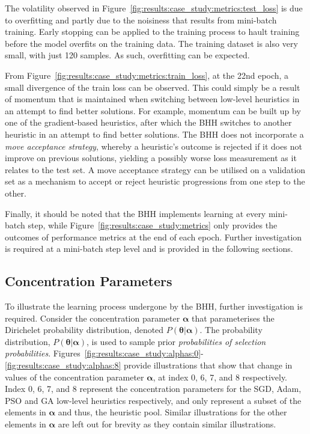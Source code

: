 The volatility observed in Figure~\ref{fig:results:case_study:metrics:test_loss} is due to overfitting and partly due to the noisiness that results from mini-batch training. Early stopping can be applied to the training process to hault training before the model overfits on the training data. The training dataset is also very small, with just 120 samples. As such, overfitting can be expected.

From Figure~\ref{fig:results:case_study:metrics:train_loss}, at the 22nd epoch, a small divergence of the train loss can be observed. This could simply be a result of momentum that is maintained when switching between low-level heuristics in an attempt to find better solutions. For example, momentum can be built up by one of the gradient-based heuristics, after which the \acs{BHH} switches to another heuristic in an attempt to find better solutions. The \acs{BHH} does not incorporate a \textit{move acceptance strategy}, whereby a heuristic's outcome is rejected if it does not improve on previous solutions, yielding a possibly worse loss measurement as it relates to the test set. A move acceptance strategy can be utilised on a validation set as a mechanism to accept or reject heuristic progressions from one step to the other.

Finally, it should be noted that the \acs{BHH} implements learning at every mini-batch step, while Figure~\ref{fig:results:case_study:metrics} only provides the outcomes of performance metrics at the end of each epoch. Further investigation is required at a mini-batch step level and is provided in the following sections.



\subsection{Concentration Parameters}\label{sec:results:case_study:concentration_parameters}

To illustrate the learning process undergone by the \acs{BHH}, further investigation is required. Consider the concentration parameter $\boldsymbol{\alpha}$ that parameterises the Dirichelet probability distribution, denoted $P(\boldsymbol{\theta} \vert \boldsymbol{\alpha})$. The probability distribution, $P(\boldsymbol{\theta} \vert \boldsymbol{\alpha})$, is used to sample prior \textit{probabilities of selection probabilities}. Figures~\ref{fig:results:case_study:alphas:0}-\ref{fig:results:case_study:alphas:8} provide illustrations that show that change in values of the concentration parameter $\boldsymbol{\alpha}$, at index 0, 6, 7, and 8 respectively. Index 0, 6, 7, and 8 represent the concentration parameters for the \acs{SGD}, \acs{Adam}, \acs{PSO} and \acs{GA} low-level heuristics respectively, and only represent a subset of the elements in $\boldsymbol{\alpha}$ and thus, the heuristic pool. Similar illustrations for the other elements in $\boldsymbol{\alpha}$ are left out for brevity as they contain similar illustrations.

